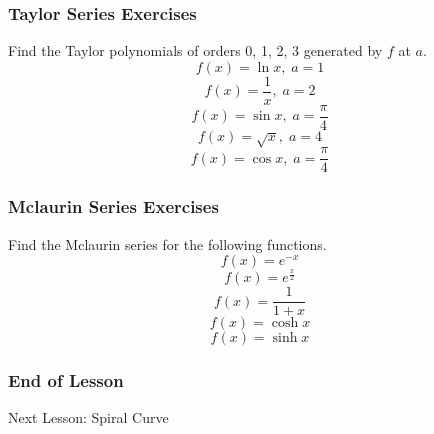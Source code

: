 \documentclass[xcolor=dvipsnames]{beamer}
\begin{document}
  \begin{frame}
    \frametitle{Taylor Series Exercises}
Find the Taylor polynomials of orders 0, 1, 2, 3 generated by $f$
at $a$.
\begin{equation}
\label{eq:chaithie}
f(x)=\ln{}x,\;a=1
\end{equation}
\begin{equation}
\label{eq:oorohkao}
f(x)=\frac{1}{x},\;a=2
\end{equation}
\begin{equation}
\label{eq:foigacoo}
f(x)=\sin{}x,\;a=\frac{\pi}{4}
\end{equation}
\begin{equation}
\label{eq:sishahgh}
f(x)=\sqrt{x},\;a=4
\end{equation}
\begin{equation}
  \label{eq:eighetog}
f(x)=\cos{}x,\;a=\frac{\pi}{4}
\end{equation}
\end{frame}

\begin{frame}
  \frametitle{Mclaurin Series Exercises}
  Find the Mclaurin series for the following functions.
  \begin{equation}
    \label{eq:oxishait}
    f(x)=e^{-x}
  \end{equation}
  \begin{equation}
    \label{eq:chuyeeye}
    f(x)=e^{\frac{x}{2}}
  \end{equation}
  \begin{equation}
    \label{eq:queiyuif}
    f(x)=\frac{1}{1+x}
  \end{equation}
  \begin{equation}
    \label{eq:aoyahphe}
    f(x)=\cosh{}x
  \end{equation}
  \begin{equation}
    \label{eq:ahtoilei}
    f(x)=\sinh{}x
  \end{equation}
\end{frame}

\begin{frame}
  \frametitle{End of Lesson}
Next Lesson: Spiral Curve
\end{frame}
\end{document}
